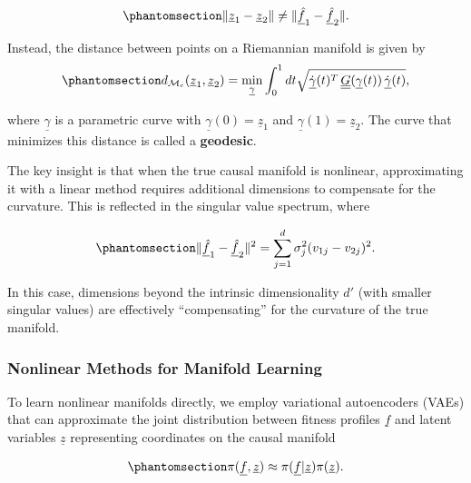 \documentclass[
]{scrartcl}
\begin{document}
\begin{refsection}
\begin{equation}\phantomsection\label{eq-nonlinear-distance}{
\|\underline{z}_1 - \underline{z}_2\| \neq 
\|\underline{\hat{f}}_1 - \underline{\hat{f}}_2\|.
}\end{equation}

Instead, the distance between points on a Riemannian manifold is given
by \begin{equation}\phantomsection\label{eq-riemannian-distance}{
d_{\mathcal{M}_c}(\underline{z}_1, \underline{z}_2) = 
\min_{\underline{\gamma}} \int_0^1 dt
\sqrt{
    \underline{\dot{\gamma}}(t)^T \, 
    \underline{\underline{G}}(\underline{\gamma}(t)) \, 
    \underline{\dot{\gamma}}(t)
},
}\end{equation}

where \(\underline{\gamma}\) is a parametric curve with
\(\underline{\gamma}(0) =
\underline{z}_1\) and \(\underline{\gamma}(1) = \underline{z}_2\). The
curve that minimizes this distance is called a \textbf{geodesic}.

The key insight is that when the true causal manifold is nonlinear,
approximating it with a linear method requires additional dimensions to
compensate for the curvature. This is reflected in the singular value
spectrum, where

\begin{equation}\phantomsection\label{eq-svd-distance}{
\|\underline{\hat{f}}_1 - \underline{\hat{f}}_2\|^2 = 
\sum_{j=1}^d \sigma_j^2(v_{1j} - v_{2j})^2.
}\end{equation}

In this case, dimensions beyond the intrinsic dimensionality \(d'\)
(with smaller singular values) are effectively ``compensating'' for the
curvature of the true manifold.

\subsubsection{Nonlinear Methods for Manifold
Learning}\label{nonlinear-methods-for-manifold-learning}

To learn nonlinear manifolds directly, we employ variational
autoencoders (VAEs) that can approximate the joint distribution between
fitness profiles \(\underline{f}\) and latent variables
\(\underline{z}\) representing coordinates on the causal manifold

\begin{equation}\phantomsection\label{eq-joint-prob}{
\pi(\underline{f}, \underline{z}) \approx 
\pi(\underline{f} | \underline{z})\pi(\underline{z}).
}\end{equation}


\end{refsection}
\end{document}
